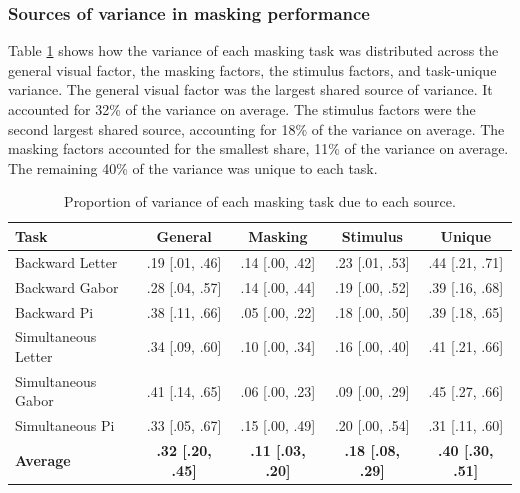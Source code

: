 \documentclass[
  ,man]{apa6}
\begin{document}
\subsubsection{Sources of variance in masking performance}\label{sources-of-variance-in-masking-performance}

Table \ref{tab:tab-shares} shows how the variance of each masking task was distributed across the general visual factor, the masking factors, the stimulus factors, and task-unique variance. The general visual factor was the largest shared source of variance. It accounted for 32\% of the variance on average. The stimulus factors were the second largest shared source, accounting for 18\% of the variance on average. The masking factors accounted for the smallest share, 11\% of the variance on average. The remaining 40\% of the variance was unique to each task.

\begin{table}[tbp]

\begin{center}
\begin{threeparttable}

\caption{\label{tab:tab-shares}Proportion of variance of each masking task due to each source.}

\begin{tabular}{lcccc}
\toprule
Task & \multicolumn{1}{c}{General} & \multicolumn{1}{c}{Masking} & \multicolumn{1}{c}{Stimulus} & \multicolumn{1}{c}{Unique}\\
\midrule
Backward Letter & .19 [.01, .46] & .14 [.00, .42] & .23 [.01, .53] & .44 [.21, .71]\\
Backward Gabor & .28 [.04, .57] & .14 [.00, .44] & .19 [.00, .52] & .39 [.16, .68]\\
Backward Pi & .38 [.11, .66] & .05 [.00, .22] & .18 [.00, .50] & .39 [.18, .65]\\
Simultaneous Letter & .34 [.09, .60] & .10 [.00, .34] & .16 [.00, .40] & .41 [.21, .66]\\
Simultaneous Gabor & .41 [.14, .65] & .06 [.00, .23] & .09 [.00, .29] & .45 [.27, .66]\\
Simultaneous Pi & .33 [.05, .67] & .15 [.00, .49] & .20 [.00, .54] & .31 [.11, .60]\\
\textbf{Average} & \textbf{.32 [.20, .45]} & \textbf{.11 [.03, .20]} & \textbf{.18 [.08, .29]} & \textbf{.40 [.30, .51]}\\
\bottomrule
\end{tabular}

\end{threeparttable}
\end{center}

\end{table}
\end{document}
